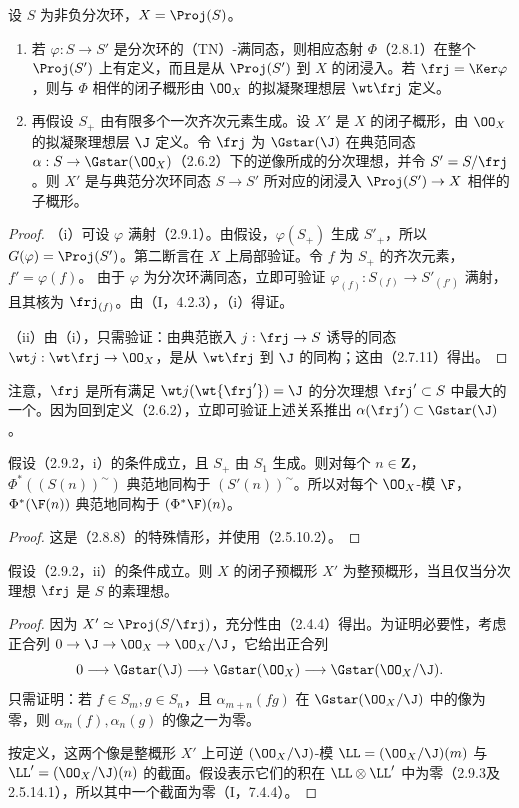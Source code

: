设 $S$ 为非负分次环，$X=\Proj(S)$。
\begin{enumerate}[label=(\roman*)]
\item 若 $\varphi:S\to S'$ 是分次环的（TN）-满同态，则相应态射 $\Phi$（2.8.1）在整个 $\Proj(S')$ 上有定义，而且是从 $\Proj(S')$ 到 $X$ 的闭浸入。若 $\frj=\Ker\varphi$，则与 $\Phi$ 相伴的闭子概形由 $\OO_X$ 的拟凝聚理想层 $\wt\frj$ 定义。
\item 再假设 $S_+$ 由有限多个一次齐次元素生成。设 $X'$ 是 $X$ 的闭子概形，由 $\OO_X$ 的拟凝聚理想层 $\J$ 定义。令 $\frj$ 为 $\Gstar(\J)$ 在典范同态
$\alpha:S\to\Gstar(\OO_X)$（2.6.2）下的逆像所成的分次理想，并令 $S'=S/\frj$。则 $X'$ 是与典范分次环同态 $S\to S'$ 所对应的闭浸入 $\Proj(S')\to X$ 相伴的子概形。
\end{enumerate}
\begin{proof}
（i）可设 $\varphi$ 满射（2.9.1）。由假设，$\varphi(S_+)$ 生成 $S'_+$，所以
$G(\varphi)=\Proj(S')$。第二断言在 $X$ 上局部验证。令 $f$ 为 $S_+$ 的齐次元素，$f'=\varphi(f)$。
由于 $\varphi$ 为分次环满同态，立即可验证
$\varphi_{(f)}:S_{(f)}\to S'_{(f')}$ 满射，且其核为 $\frj_{(f)}$。由（I，4.2.3），（i）得证。

（ii）由（i），只需验证：由典范嵌入 $j:\frj\to S$ 诱导的同态
$\wt j:\wt\frj\to\OO_X$，是从 $\wt\frj$ 到 $\J$ 的同构；这由（2.7.11）得出。
\end{proof}
注意，$\frj$ 是所有满足 $\wt j(\wt{\frj'})=\J$ 的分次理想 $\frj'\subset S$ 中最大的一个。因为回到定义（2.6.2），立即可验证上述关系推出
$\alpha(\frj')\subset\Gstar(\J)$。

假设（2.9.2，i）的条件成立，且 $S_+$ 由 $S_1$ 生成。则对每个 $n\in\mathbf Z$，
$\Phi^*((S(n))^\sim)$ 典范地同构于 $(S'(n))^\sim$。所以对每个 $\OO_X$-模 $\F$，$\Phi^*(\F(n))$ 典范地同构于 $(\Phi^*\F)(n)$。
\begin{proof}
这是（2.8.8）的特殊情形，并使用（2.5.10.2）。
\end{proof}

假设（2.9.2，ii）的条件成立。则 $X$ 的闭子预概形 $X'$ 为整预概形，当且仅当分次理想 $\frj$ 是 $S$ 的素理想。
\begin{proof}
因为 $X'\simeq\Proj(S/\frj)$，充分性由（2.4.4）得出。为证明必要性，考虑正合列
$0\to\J\to\OO_X\to\OO_X/\J$，它给出正合列
\[
0\longrightarrow\Gstar(\J)\longrightarrow\Gstar(\OO_X)
\longrightarrow\Gstar(\OO_X/\J).
\]
只需证明：若 $f\in S_m,g\in S_n$，且 $\alpha_{m+n}(fg)$ 在 $\Gstar(\OO_X/\J)$ 中的像为零，则 $\alpha_m(f),\alpha_n(g)$ 的像之一为零。

按定义，这两个像是整概形 $X'$ 上可逆 $(\OO_X/\J)$-模
$\LL=(\OO_X/\J)(m)$ 与 $\LL'=(\OO_X/\J)(n)$ 的截面。假设表示它们的积在 $\LL\otimes\LL'$ 中为零（2.9.3及2.5.14.1），所以其中一个截面为零（I，7.4.4）。
\end{proof}

